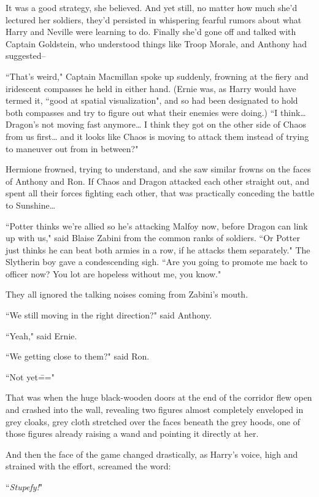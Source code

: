 It was a good strategy, she believed. And yet still, no matter how much she'd lectured her soldiers, they'd persisted in whispering fearful rumors about what Harry and Neville were learning to do. Finally she'd gone off and talked with Captain Goldstein, who understood things like Troop Morale, and Anthony had suggested\---

``That's weird," Captain Macmillan spoke up suddenly, frowning at the fiery and iridescent compasses he held in either hand. (Ernie was, as Harry would have termed it, ``good at spatial visualization", and so had been designated to hold both compasses and try to figure out what their enemies were doing.) ``I think{\ldots} Dragon's not moving fast anymore{\ldots} I think they got on the other side of Chaos from us first{\ldots} and it looks like Chaos is moving to attack them instead of trying to maneuver out from in between?"

Hermione frowned, trying to understand, and she saw similar frowns on the faces of Anthony and Ron. If Chaos and Dragon attacked each other straight out, and spent all their forces fighting each other, that was practically conceding the battle to Sunshine{\ldots}

``Potter thinks we're allied so he's attacking Malfoy now, before Dragon can link up with us," said Blaise Zabini from the common ranks of soldiers. ``Or Potter just thinks he can beat both armies in a row, if he attacks them separately." The Slytherin boy gave a condescending sigh. ``Are you going to promote me back to officer now? You lot are hopeless without me, you know."

They all ignored the talking noises coming from Zabini's mouth.

``We still moving in the right direction?" said Anthony.

``Yeah," said Ernie.

``We getting close to them?" said Ron.

``Not yet\==="

That was when the huge black-wooden doors at the end of the corridor flew open and crashed into the wall, revealing two figures almost completely enveloped in grey cloaks, grey cloth stretched over the faces beneath the grey hoods, one of those figures already raising a wand and pointing it directly at her.

And then the face of the game changed drastically, as Harry's voice, high and strained with the effort, screamed the word:

``\emph{Stupefy!}"

